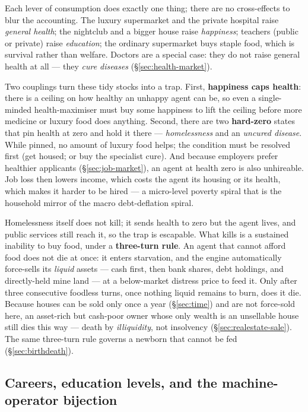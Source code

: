\documentclass[11pt]{article}
\begin{document}
Each lever of consumption does exactly one thing; there are no cross-effects to
blur the accounting. The luxury supermarket and the private hospital raise
\emph{general health}; the nightclub and a bigger house raise \emph{happiness};
teachers (public or private) raise \emph{education}; the ordinary supermarket
buys staple food, which is survival rather than welfare. Doctors are a special
case: they do not raise general health at all --- they \emph{cure diseases}
(\S\ref{sec:health-market}).

Two couplings turn these tidy stocks into a trap. First, \textbf{happiness caps
health}: there is a ceiling on how healthy an unhappy agent can be, so even a
single-minded health-maximiser must buy some happiness to lift the ceiling
before more medicine or luxury food does anything. Second, there are two
\textbf{hard-zero} states that pin health at zero and hold it there ---
\emph{homelessness} and an \emph{uncured disease}. While pinned, no amount of
luxury food helps; the condition must be resolved first (get housed; or buy the
specialist cure). And because employers prefer healthier applicants
(\S\ref{sec:job-market}), an agent at health zero is also unhireable. Job loss
then lowers income, which costs the agent its housing or its health, which makes
it harder to be hired --- a micro-level poverty spiral that is the household
mirror of the macro debt-deflation spiral.

Homelessness itself does not kill; it sends health to zero but the agent lives,
and public services still reach it, so the trap is escapable. What kills is a
sustained inability to buy food, under a \textbf{three-turn rule}. An agent that
cannot afford food does not die at once: it enters starvation, and the engine
automatically force-sells its \emph{liquid} assets --- cash first, then bank
shares, debt holdings, and directly-held mine land --- at a below-market distress
price to feed it. Only after three consecutive foodless turns, once nothing
liquid remains to burn, does it die. Because houses can be sold only once a year
(\S\ref{sec:time}) and are not force-sold here, an asset-rich but cash-poor owner
whose only wealth is an unsellable house still dies this way --- death by
\emph{illiquidity}, not insolvency (\S\ref{sec:realestate-sale}). The same
three-turn rule governs a newborn that cannot be fed (\S\ref{sec:birthdeath}).

\subsection{Careers, education levels, and the machine-operator bijection}
\label{sec:bijection}
\end{document}
